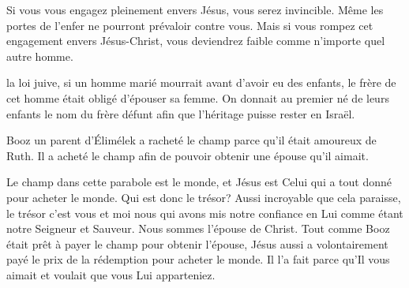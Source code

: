 
Si vous vous engagez pleinement envers Jésus, vous serez invincible.
 Même les portes de l'enfer ne pourront prévaloir contre vous.
 Mais si vous rompez cet engagement envers Jésus-Christ,
 vous deviendrez faible comme n'importe quel autre homme. 

\dvrule






 la loi juive, si un homme marié mourrait
 avant d'avoir eu des enfants, le frère de cet homme était obligé
 d'épouser sa femme.
 On donnait au premier né de leurs enfants le nom du frère défunt
 afin que l'héritage puisse rester en Israël.

Booz \ocadr un parent d'Élimélek \fcadr{} a racheté le champ parce
 qu'il était amoureux de Ruth.
 Il a acheté le champ afin de pouvoir obtenir une épouse qu'il aimait.


Le champ dans cette parabole est le monde, et Jésus est Celui
 qui a tout donné pour acheter le monde. Qui est donc le trésor?
 Aussi incroyable que cela paraisse, le trésor c'est vous et moi
 \ocadr nous qui avons mis notre confiance en Lui comme étant notre Seigneur
 et Sauveur.
 Nous sommes l'épouse de Christ.
 Tout comme Booz était prêt à payer le champ pour obtenir l'épouse,
 Jésus aussi a volontairement payé le prix de la rédemption
 pour acheter le monde.
 Il l'a fait parce qu'Il vous aimait et voulait que vous Lui apparteniez. 

\dvrule

